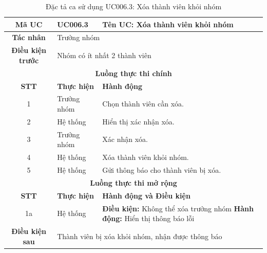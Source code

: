 \begin{table}[H]
    \centering
    \label{tab:uc006-3}
    \begin{tabularx}{\textwidth}{|c|p{3.5cm}|X|}
        \hline
        \rowcolor{headergreen} 
        \textbf{Mã UC} & \textbf{UC006.3} & \textbf{Tên UC: Xóa thành viên khỏi nhóm} \\ \hline
        \textbf{Tác nhân} & \multicolumn{2}{l|}{Trưởng nhóm} \\ \hline
        \textbf{Điều kiện trước} & \multicolumn{2}{X|}{Nhóm có ít nhất 2 thành viên} \\ \hline
        
        \multicolumn{3}{|c|}{\cellcolor{headerorange}\textbf{Luồng thực thi chính}} \\ \hline
        \rowcolor{graybg} \textbf{STT} & \textbf{Thực hiện} & \textbf{Hành động} \\ \hline
        1 & Trưởng nhóm & Chọn thành viên cần xóa. \\ \hline
        2 & Hệ thống & Hiển thị xác nhận xóa. \\ \hline
        3 & Trưởng nhóm & Xác nhận xóa. \\ \hline
        4 & Hệ thống & Xóa thành viên khỏi nhóm. \\ \hline
        5 & Hệ thống & Gửi thông báo cho thành viên bị xóa. \\ \hline
        
        \multicolumn{3}{|c|}{\cellcolor{headerorange}\textbf{Luồng thực thi mở rộng}} \\ \hline
        \rowcolor{graybg} \textbf{STT} & \textbf{Thực hiện} & \textbf{Hành động và Điều kiện} \\ \hline
        1a & Hệ thống & \textbf{Điều kiện:} Không thể xóa trưởng nhóm \newline \textbf{Hành động:} Hiển thị thông báo lỗi \\ \hline
        
        \textbf{Điều kiện sau} & \multicolumn{2}{X|}{Thành viên bị xóa khỏi nhóm, nhận được thông báo} \\ \hline
    \end{tabularx}
    \caption{Đặc tả ca sử dụng UC006.3: Xóa thành viên khỏi nhóm}
\end{table}

